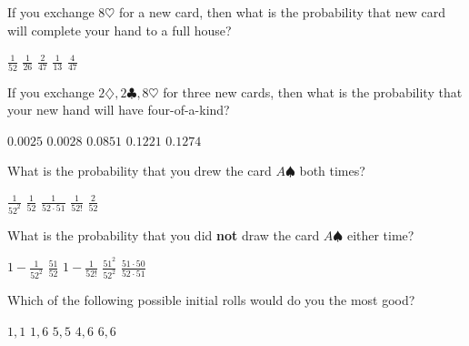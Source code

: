 \documentclass[answers,12pt]{exam}
\begin{document}
\begin{questions}
\question\label{FirstPoker} 
If you exchange $8\heartsuit$ for a new card,
then what is the probability that new card
will complete your hand to a full house?\\
\begin{oneparchoices}
\choice $\frac{1}{52}$
\choice $\frac{1}{26}$ %
\choice $\frac{2}{47}$ %
\choice $\frac{1}{13}$ %
\correctchoice $\frac{4}{47}$
\end{oneparchoices}

\question\label{LastPoker}
If you exchange $2\diamondsuit,2\clubsuit,8\heartsuit$ for three
new cards, then what is the probability that your new hand
will have four-of-a-kind?\\
\begin{oneparchoices}
\choice $0.0025$ %
\correctchoice $0.0028$
\choice $0.0851$ %
\choice $0.1221$ %
\choice $0.1274$ %
\end{oneparchoices}


\question\label{FirstDeck} What is the probability that you
drew the card $A\spadesuit$ both times?\\
\begin{oneparchoices}
\correctchoice $\frac{1}{52^2}$
\choice $\frac{1}{52}$
\choice $\frac{1}{52\cdot 51}$
\choice $\frac{1}{52!}$
\choice $\frac{2}{52}$
\end{oneparchoices}

\question\label{LastDeck} What is the probability that you
did {\bf not} draw the card $A\spadesuit$ either time?\\
\begin{oneparchoices}
\choice $1-\frac{1}{52^2}$
\choice $\frac{51}{52}$
\choice $1-\frac{1}{52!}$
\correctchoice $\frac{51^2}{52^2}$
\choice $\frac{51\cdot 50}{52\cdot 51}$
\end{oneparchoices}


\question\label{FirstCraps}
Which of the following possible initial rolls
would do you the most good?\\
\begin{oneparchoices}
\choice $1,1$ %
\correctchoice $1,6$
\choice $5,5$
\choice $4,6$
\choice $6,6$ %
\end{oneparchoices}


\end{questions}
\end{document}
